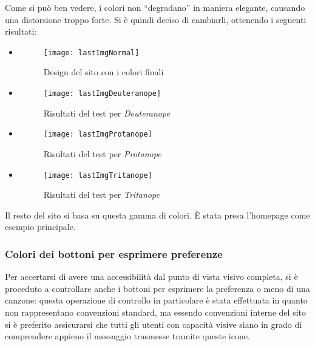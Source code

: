 Come si può ben vedere, i colori non ``degradano'' in maniera elegante, causando una distorsione troppo forte. Si è quindi deciso di cambiarli, ottenendo i seguenti risultati:
\begin{itemize}

    \item[]
       \begin{figure}[H]

            \centering
            \texttt{[image: lastImgNormal]}
            \caption{Design del sito con i colori finali}
        \end{figure}

    \item[]
        \begin{figure}[H]

            \centering
            \texttt{[image: lastImgDeuteranope]}
            \caption{Risultati del test per \textit{Deuteranope}}
        \end{figure}

    \item[]
        \begin{figure}[H]

            \centering
            \texttt{[image: lastImgProtanope]}
            \caption{Risultati del test per \textit{Protanope}}
        \end{figure}

    \item[]
        \begin{figure}[H]

            \centering
            \texttt{[image: lastImgTritanope]}
            \caption{Risultati del test per \textit{Tritanope}}
        \end{figure}

\end{itemize}

Il resto del sito si basa su questa gamma di colori. \`E stata presa l'homepage come esempio principale.

\subsubsection{Colori dei bottoni per esprimere preferenze}
Per accertarsi di avere una accessibilit\`a dal punto di vista visivo completa, si \`e proceduto a controllare anche i bottoni per esprimere la preferenza o meno di una canzone: questa operazione di controllo in particolare \`e stata effettuata in quanto non rappresentano convenzioni standard, ma essendo convenzioni interne del sito si \`e preferito assicurarsi che tutti gli utenti con capacit\`a visive siano in grado di comprendere appieno il messaggio trasmesse tramite queste icone.

